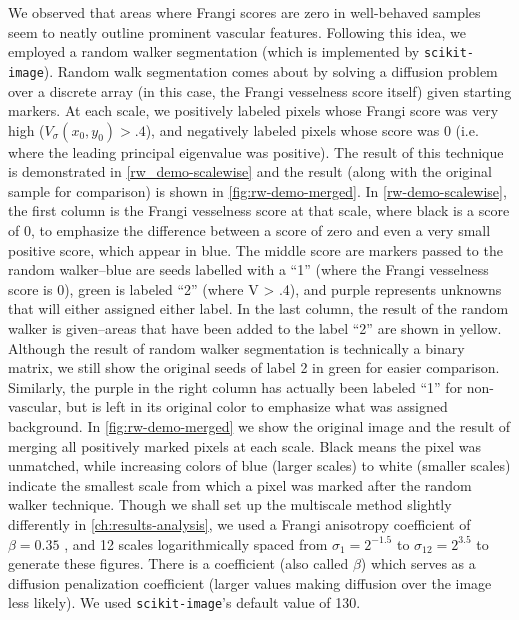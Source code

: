 We observed that areas where Frangi scores are zero in well-behaved samples seem to neatly outline prominent vascular features. Following this idea, we employed a random walker segmentation \cite{Grady-Random-Walks} (which is implemented by \texttt{scikit-image}). Random walk segmentation comes about by solving a diffusion problem over a discrete array (in this case, the Frangi vesselness score itself) given starting markers. At each scale, we positively labeled pixels whose Frangi score was very high ($V_\sigma(x_0,y_0) > .4$), and negatively labeled pixels whose score was $0$ (i.e. where the leading principal eigenvalue was positive). The result of this technique is demonstrated in \cref{rw_demo-scalewise} and the result (along with the original sample for comparison) is shown in \cref{fig:rw-demo-merged}.
In \cref{rw-demo-scalewise}, the first column is the Frangi vesselness score at that scale, where black is a score of 0, to emphasize the difference between a score of zero and even a very small positive score, which appear in blue. The middle score are markers passed to the random walker--blue are seeds labelled with a ``1'' (where the Frangi vesselness score is 0), green is labeled ``2'' (where V > .4), and purple represents unknowns that will either assigned either label. In the last column, the result of the random walker is given--areas that have been added to the label ``2'' are shown in yellow. Although the result of random walker segmentation is technically a binary matrix, we still show the original seeds of label 2 in green for easier comparison. Similarly, the purple in the right column has actually been labeled ``1'' for non-vascular, but is left in its original color to emphasize what was assigned background. In \cref{fig:rw-demo-merged} we show the original image and the result of merging all positively marked pixels at each scale. Black means the pixel was unmatched, while increasing colors of blue (larger scales) to white (smaller scales) indicate the smallest scale from which a pixel was marked after the random walker technique.  Though we shall set up the multiscale method slightly differently in \cref{ch:results-analysis}, we used a Frangi anisotropy coefficient of $\beta=0.35$ , and 12 scales logarithmically spaced from $\sigma_1 = 2^{-1.5} $ to $\sigma_12 = 2^{3.5}$ to generate these figures. There is a coefficient (also called $\beta$) which serves as a diffusion penalization coefficient (larger values making diffusion over the image less likely). We used \texttt{scikit-image}'s default value of 130. 

